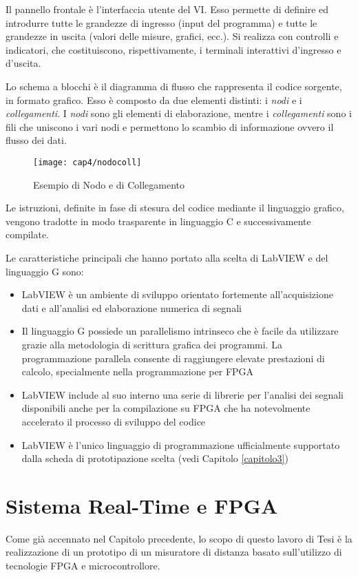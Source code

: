Il pannello frontale è l'interfaccia utente del VI. Esso permette di definire ed introdurre tutte le grandezze di ingresso (input del programma) e tutte le grandezze in uscita (valori delle misure, grafici, ecc.). Si realizza con controlli e indicatori, che costituiscono, rispettivamente, i terminali interattivi d'ingresso e d'uscita.
 
Lo schema a blocchi è il diagramma di flusso che rappresenta il codice sorgente, in formato grafico. Esso è composto da due elementi distinti: i \textit{nodi} e i \textit{collegamenti}. I \textit{nodi} sono gli elementi di elaborazione, mentre i \textit{collegamenti} sono i fili che uniscono i vari nodi e permettono lo scambio di informazione ovvero il flusso dei dati.

\begin{figure}  
  \begin{center}
    \texttt{[image: cap4/nodocoll]}
    \caption{Esempio di Nodo e di Collegamento}
    \label{nodocoll}
  \end{center}
\end{figure}

Le istruzioni, definite in fase di stesura del codice mediante il linguaggio grafico, vengono tradotte in modo trasparente in linguaggio C e successivamente compilate.

Le caratteristiche principali che hanno portato alla scelta di LabVIEW e del linguaggio G sono:
\begin{itemize}
	\item LabVIEW è un ambiente di sviluppo orientato fortemente all'acquisizione dati e all'analisi ed elaborazione numerica di segnali
	\item Il linguaggio G possiede un parallelismo intrinseco che è facile da utilizzare grazie alla metodologia di scrittura grafica dei programmi. La programmazione parallela consente di raggiungere elevate prestazioni di calcolo, specialmente nella programmazione per FPGA
	\item LabVIEW include al suo interno una serie di librerie per l'analisi dei segnali disponibili anche per la compilazione su FPGA che ha notevolmente accelerato il processo di sviluppo del codice
	\item LabVIEW è l'unico linguaggio di programmazione ufficialmente supportato dalla scheda di prototipazione scelta (vedi Capitolo \ref{capitolo3})
\end{itemize}

\section{Sistema Real-Time e FPGA}
Come già accennato nel Capitolo precedente, lo scopo di questo lavoro di Tesi è la realizzazione di un prototipo di un misuratore di distanza basato sull'utilizzo di tecnologie FPGA e microcontrollore.

